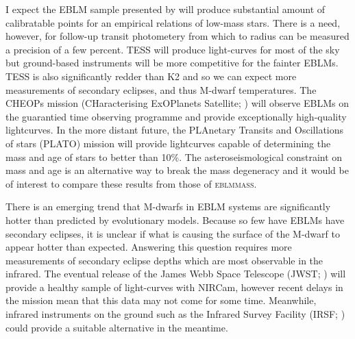 %   

I expect the EBLM sample presented by \citet{Triaud2017} will produce substantial amount of calibratable points for an empirical relations of low-mass stars. There is a need, however, for follow-up transit photometery from which to radius can be measured a precision of a few percent. TESS will produce light-curves for most of the sky but ground-based instruments will be more competitive for the fainter EBLMs. TESS is also significantly redder than K2 and so we can expect more measurements of secondary eclipses, and thus M-dwarf temperatures. The CHEOPs mission (CHaracterising ExOPlanets Satellite; \citealt{2013EPJWC..4703005B}) will observe EBLMs on the guarantied time observing programme and provide exceptionally high-quality lightcurves. In the more distant future, the PLAnetary Transits and Oscillations of stars (PLATO) mission will provide lightcurves capable of determining the mass and age of stars to better than 10\%. The asteroseismological constraint on mass and age is an alternative way to break the mass degeneracy and it would be of interest to compare these results from those of \textsc{eblmmass}.

There is an emerging trend that M-dwarfs in EBLM systems are significantly hotter than predicted by evolutionary models. Because so few have EBLMs have secondary eclipses, it is unclear if what is causing the surface of the M-dwarf to appear hotter than expected. Answering this question requires more measurements of secondary eclipse depths which are most observable in the infrared. The eventual release of the James Webb Space Telescope (JWST; \citealt{2017A&A...600A..10M}) will provide a healthy sample of light-curves with NIRCam, however recent delays in the mission mean that this data may not come for some time. Meanwhile, infrared instruments on the ground such as the Infrared Survey Facility (IRSF; \citealt{2003SPIE.4841..459N}) could provide a suitable alternative in the meantime.

